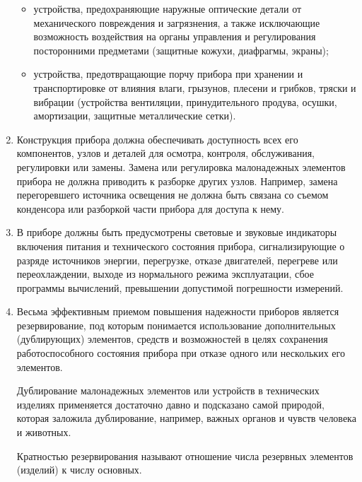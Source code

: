 \begin{enumerate}
\begin{itemize}
\item устройства, предохраняющие наружные оптические детали от механического повреждения и загрязнения, а также исключающие возможность воздействия на органы управления и регулирования посторонними предметами (защитные кожухи, диафрагмы, экраны);
\item устройства, предотвращающие порчу прибора при хранении и транспортировке от влияния влаги, грызунов, плесени и грибков, тряски и вибрации (устройства вентиляции, принудительного продува, осушки, амортизации, защитные металлические сетки).
\end{itemize}
\item Конструкция прибора должна обеспечивать доступность всех его компонентов, узлов и деталей для осмотра, контроля, обслуживания, регулировки или замены. Замена или регулировка малонадежных элементов прибора не должна приводить к разборке других узлов. Например, замена перегоревшего источника освещения не должна быть связана со съемом конденсора или разборкой части прибора для доступа к нему.
\item В приборе должны быть предусмотрены световые и звуковые индикаторы включения питания и технического состояния прибора, сигнализирующие о разряде источников энергии, перегрузке, отказе двигателей, перегреве или переохлаждении, выходе из нормального режима эксплуатации, сбое программы вычислений, превышении допустимой погрешности измерений.
\item Весьма эффективным приемом повышения надежности приборов является резервирование, под которым понимается использование дополнительных (дублирующих) элементов, средств и возможностей в целях сохранения работоспособного состояния прибора при отказе одного или нескольких его элементов.

Дублирование малонадежных элементов или устройств в технических изделиях применяется достаточно давно и подсказано самой природой, которая заложила дублирование, например, важных органов и чувств человека и животных.

Кратностью резервирования называют отношение числа резервных элементов (изделий) к числу основных.


\end{enumerate}
